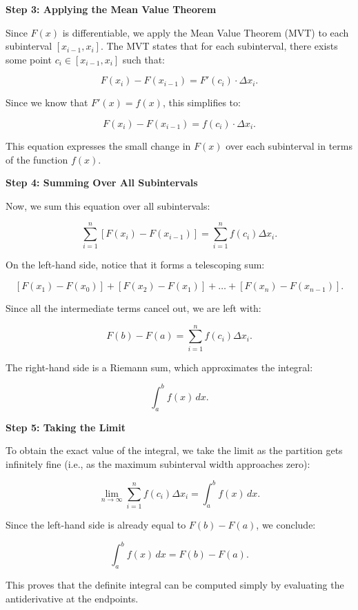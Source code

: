 \documentclass{beamer}
\begin{document}
\begin{frame}
\textbf{Step 3: Applying the Mean Value Theorem}

Since \( F(x) \) is differentiable, we apply the Mean Value Theorem (MVT) to each subinterval \([x_{i-1}, x_i]\). The MVT states that for each subinterval, there exists some point \( c_i \in [x_{i-1}, x_i] \) such that:

\[
F(x_i) - F(x_{i-1}) = F'(c_i) \cdot \Delta x_i.
\]

Since we know that \( F'(x) = f(x) \), this simplifies to:

\[
F(x_i) - F(x_{i-1}) = f(c_i) \cdot \Delta x_i.
\]

This equation expresses the small change in \( F(x) \) over each subinterval in terms of the function \( f(x) \).
\end{frame}
\newpage

\begin{frame}
\textbf{Step 4: Summing Over All Subintervals}

Now, we sum this equation over all subintervals:

\[
\sum_{i=1}^{n} \left[ F(x_i) - F(x_{i-1}) \right] = \sum_{i=1}^{n} f(c_i) \Delta x_i.
\]

On the left-hand side, notice that it forms a telescoping sum:

\[
[F(x_1) - F(x_0)] + [F(x_2) - F(x_1)] + \dots + [F(x_n) - F(x_{n-1})].
\]

Since all the intermediate terms cancel out, we are left with:

\[
F(b) - F(a) = \sum_{i=1}^{n} f(c_i) \Delta x_i.
\]

The right-hand side is a Riemann sum, which approximates the integral:

\[
\int_{a}^{b} f(x) \, dx.
\]
\end{frame}
\newpage

\begin{frame}
\textbf{Step 5: Taking the Limit}

To obtain the exact value of the integral, we take the limit as the partition gets infinitely fine (i.e., as the maximum subinterval width approaches zero):

\[
\lim_{n \to \infty} \sum_{i=1}^{n} f(c_i) \Delta x_i = \int_{a}^{b} f(x) \, dx.
\]

Since the left-hand side is already equal to \( F(b) - F(a) \), we conclude:

\[
\int_{a}^{b} f(x) \, dx = F(b) - F(a).
\]

This proves that the definite integral can be computed simply by evaluating the antiderivative at the endpoints.
\end{frame}
\newpage
\end{document}
